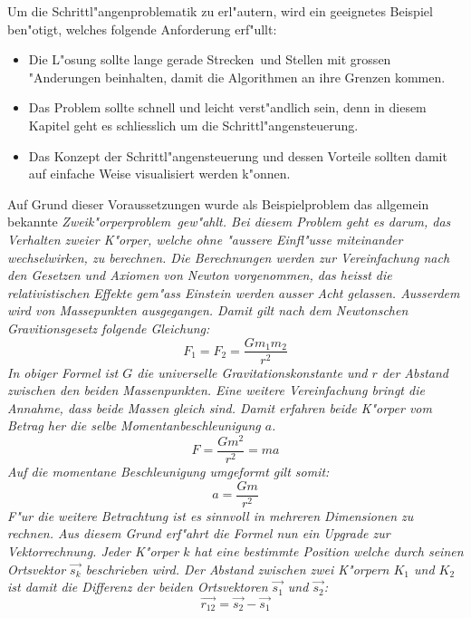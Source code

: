 \begin{refsection}
Um die Schrittl"angenproblematik zu erl"autern, wird ein geeignetes Beispiel ben"otigt, welches folgende Anforderung erf"ullt: 
\begin{itemize}
\item Die L"osung sollte \glqq lange gerade Strecken\grqq~und Stellen mit grossen "Anderungen beinhalten, damit die Algorithmen an ihre Grenzen kommen.
\item Das Problem sollte schnell und leicht verst"andlich sein, denn in diesem Kapitel geht es schliesslich um die Schrittl"angensteuerung.
\item Das Konzept der Schrittl"angensteuerung und dessen Vorteile sollten damit auf einfache Weise visualisiert werden k"onnen.
\end{itemize}
Auf Grund dieser Voraussetzungen wurde als Beispielproblem das allgemein bekannte \em Zweik"orperproblem\em~gew"ahlt.
Bei diesem Problem geht es darum, das Verhalten zweier K"orper, welche ohne "aussere Einfl"usse miteinander wechselwirken, zu berechnen. 
Die Berechnungen werden zur Vereinfachung nach den Gesetzen und Axiomen von Newton vorgenommen, das heisst die relativistischen Effekte gem"ass Einstein werden ausser Acht gelassen.
Ausserdem wird von Massepunkten ausgegangen.
Damit gilt nach dem Newtonschen Gravitionsgesetz folgende Gleichung:
\begin{equation} \label{eq:newton}
F_1 = F_2=\frac{G m_1 m_2}{r^2}
\end{equation}
In obiger Formel ist $G$ die universelle Gravitationskonstante und $r$ der Abstand zwischen den beiden Massenpunkten.
Eine weitere Vereinfachung bringt die Annahme, dass beide Massen gleich sind. 
Damit erfahren beide K"orper vom Betrag her die selbe Momentanbeschleunigung $a$.
\begin{equation}
F=\frac{G m^2}{r^2}=m a
\end{equation}
Auf die momentane Beschleunigung umgeformt gilt somit:
\begin{equation}
a=\frac{G m}{r^2} \label{eq:beschleunigungSkalar}
\end{equation}
F"ur die weitere Betrachtung ist es sinnvoll in mehreren Dimensionen zu rechnen.
Aus diesem Grund erf"ahrt die Formel nun ein Upgrade zur Vektorrechnung.
Jeder K"orper $k$ hat eine bestimmte Position welche durch seinen Ortsvektor $\vec{s_k}$ beschrieben wird.
Der Abstand zwischen zwei K"orpern $K_1$ und $K_2$ ist damit die Differenz der beiden Ortsvektoren  $\vec{s_1}$ und $\vec{s_2}$:
\begin{equation} \label{eq:abstand}
\vec{r_{12}}= \vec{s_2}-\vec{s_1}

\end{equation}
\end{refsection}
